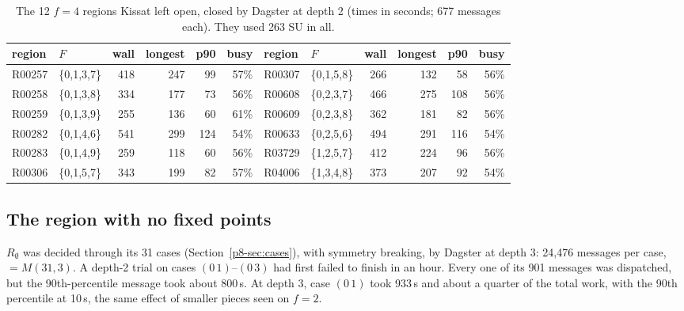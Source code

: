\documentclass[11pt,a4paper,oneside]{report}
\theoremstyle{definition}
\begin{document}
\begin{table}[H]
\centering
\small
\begin{tabular}{@{}llrrrr|llrrrr@{}}
\toprule
region & $F$ & wall & longest & p90 & busy & region & $F$ & wall & longest & p90 & busy \\
\midrule
R00257 & \{0,1,3,7\} & 418 & 247 & 99 & 57\% & R00307 & \{0,1,5,8\} & 266 & 132 & 58 & 56\% \\
R00258 & \{0,1,3,8\} & 334 & 177 & 73 & 56\% & R00608 & \{0,2,3,7\} & 466 & 275 & 108 & 56\% \\
R00259 & \{0,1,3,9\} & 255 & 136 & 60 & 61\% & R00609 & \{0,2,3,8\} & 362 & 181 & 82 & 56\% \\
R00282 & \{0,1,4,6\} & 541 & 299 & 124 & 54\% & R00633 & \{0,2,5,6\} & 494 & 291 & 116 & 54\% \\
R00283 & \{0,1,4,9\} & 259 & 118 & 60 & 56\% & R03729 & \{1,2,5,7\} & 412 & 224 & 96 & 56\% \\
R00306 & \{0,1,5,7\} & 343 & 199 & 82 & 57\% & R04006 & \{1,3,4,8\} & 373 & 207 & 92 & 54\% \\
\bottomrule
\end{tabular}
\caption{The 12 $f=4$ regions Kissat left open, closed by Dagster at depth 2 (times in
seconds; 677 messages each). They used 263 SU in all.}
\label{p8-tab:f4strag}
\end{table}

\subsection{The region with no fixed points}\label{p8-sec:f0}

$R_\emptyset$ was decided through its 31 cases (Section~\ref{p8-sec:cases}), with symmetry
breaking, by Dagster at depth 3: 24{,}476 messages per case, $=M(31,3)$. A depth-2 trial on
cases $(0\,1)$--$(0\,3)$ had first failed to finish in an hour. Every one of its 901 messages
was dispatched, but the 90th-percentile message took about 800\,s. At depth 3, case $(0\,1)$
took 933\,s and about a quarter of the total work, with the 90th percentile at 10\,s, the same
effect of smaller pieces seen on $f=2$.
\end{document}
